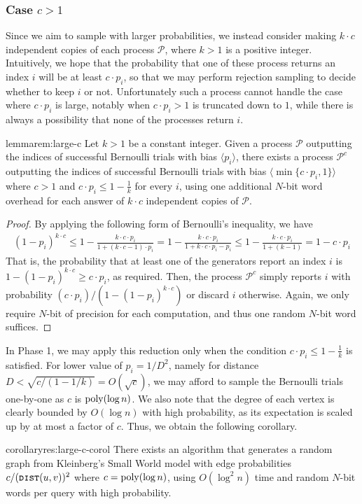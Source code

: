 \subsubsection{Case $c > 1$}

Since we aim to sample with larger probabilities, we instead consider making $k\cdot c$ independent copies of each process $\mathcal{P}$, where $k>1$ is a positive integer.
Intuitively, we hope that the probability that one of these process returns an index $i$ will be at least $c\cdot p_i$, so that we may perform rejection sampling to decide whether to keep $i$ or not.
Unfortunately such a process cannot handle the case where $c\cdot p_i$ is large, notably when $c\cdot p_i > 1$ is truncated down to $1$, while there is always a possibility that none of the processes return $i$.

\begin{restatable}{lemma}{rem:large-c}
Let $k>1$ be a constant integer. Given a process $\mathcal{P}$ outputting the indices of successful Bernoulli trials with bias $\langle p_i\rangle$, there exists a process $\mathcal{P}^c$ outputting the indices of successful Bernoulli trials with bias $\langle \min\{c\cdot p_i, 1\}\rangle$ where $c>1$ and $c \cdot p_i \leq 1-\frac{1}{k}$ for every $i$,
using one additional $N$-bit word overhead for each answer of $k\cdot c$ independent copies of $\mathcal{P}$.
\end{restatable}
\begin{proof}
By applying the following form of Bernoulli's inequality, we have
\begin{align*}
(1-p_{i})^{k\cdot c} \leq 1-\frac{k\cdot c\cdot p_{i}}{1+(k\cdot c-1)\cdot p_{i}}
= 1-\frac{k\cdot c\cdot p_{i}}{1+k\cdot c\cdot p_{i}-p_{i}}
\leq 1-\frac{k\cdot c\cdot p_{i}}{1+(k-1)} = 1-c\cdot p_{i}
\end{align*}
That is, the probability that at least one of the generators report an index $i$ is $1-(1-p_{i})^{k\cdot c} \geq c\cdot p_i$, as required.
Then, the process $\mathcal{P}^c$ simply reports $i$ with probability $(c\cdot p_i) / (1-(1-p_{i})^{k\cdot c})$ or discard $i$ otherwise.
Again, we only require $N$-bit of precision for each computation, and thus one random $N$-bit word suffices.
\end{proof}

In Phase 1, we may apply this reduction only when the condition $c \cdot p_i \leq 1-\frac{1}{k}$ is satisfied.
For lower value of $p_i = 1/D^2$, namely for distance $D < \sqrt{c/(1-1/k)} = O(\sqrt{c})$, we may afford to sample the Bernoulli trials one-by-one as $c$ is $\mathrm{poly}(\log n)$.
We also note that the degree of each vertex is clearly bounded by $O(\log n)$ with high probability, as its expectation is scaled up by at most a factor of $c$.
Thus, we obtain the following corollary.
\begin{restatable}{corollary}{res:large-c-corol}
There exists an algorithm that generates a random graph from Kleinberg's Small World model with edge probabilities $c/(\texttt{\textsc{dist}}(u,v))^2$ where $c = \mathrm{poly}(\log n)$,
using $O(\log^2 n)$ time and random $N$-bit words per  query with high probability.
\end{restatable}

